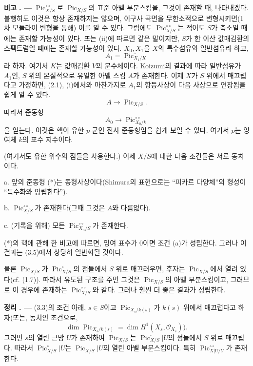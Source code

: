 \documentclass[11pt,twoside,openany]{book}
\numberwithin{equation}{section}
\newcommand{\sourceunit}{front}
\newcommand{\src}[1]{%
  \phantomsection\hypertarget{src:\sourceunit:#1}{}%
  \marginpar{\raggedleft\footnotesize\sffamily #1}%
}
\theoremstyle{plain}
\theoremstyle{definition}
\theoremstyle{remark}
\newcommand{\result}[2]{%
  \par\medskip\noindent\textbf{#1%
  \if\relax\detokenize{#2}\relax\else\space#2\fi. ---}\enspace
}
\begin{document}
\result{비고}{3.4} $\operatorname{Pic}_{X/S}^{\circ\circ}$로
$\operatorname{Pic}_{X/S}$의 표준 아벨 부분스킴을, 그것이 존재할 때,
나타내겠다. 불행히도 이것은 항상 존재하지는 않으며, 이구사 곡면을
무한소적으로 변형시키면(1차 모듈라이 변형을 통해) 이를 알 수 있다.
그럼에도 $\operatorname{Pic}_{X/S}^{\circ\circ}$는 적어도 $S$가 축소일
때에는 존재할 가능성이 있다. 또는 (ii)에 따르면 같은 말이지만, $S$가
한 이산 값매김환의 스펙트럼일 때에는 존재할 가능성이 있다. $X_0,X_1$을
$X$의 특수섬유와 일반섬유라 하고,
\[
A_1=\operatorname{Pic}_{X_1/K}^\circ
\]
라 하자. 여기서 $K$는 값매김환 $V$의 분수체이다. Koizumi의 결과에 따라
일반섬유가 $A_1$인, $S$ 위의 본질적으로 유일한 아벨 스킴 $A$가 존재한다.
이제 $X$가 $S$ 위에서 매끄럽다고 가정하면, (2.1), (i)에서와 마찬가지로
$A_1$의 항등사상이 다음 사상으로 연장됨을 쉽게 알 수 있다.
\[
A\longrightarrow\operatorname{Pic}_{X/S}.
\]
따라서 준동형
\[
\tag{*}A_0\longrightarrow\operatorname{Pic}_{X_0/k}^{\circ\circ}
\]
을 얻는다. 이것은 핵이 유한 $p$-군인 전사 준동형임을 쉽게 보일 수 있다.
여기서 $p$는 잉여체 $k$의 표수 지수이다.

\src{239}
(여기서도 유한 위수의 점들을 사용한다.) 이제 $X/S$에 대한 다음 조건들은
서로 동치이다.

\medskip
\noindent a. 앞의 준동형 (*)는 동형사상이다(Shimura의 표현으로는
``피카르 다양체''의 형성이 ``특수화와 양립한다'').

\noindent b. $\operatorname{Pic}_{X/S}^{\circ\circ}$가 존재한다(그때 그것은
$A$와 다름없다).

\noindent c. (기록을 위해) 모든
$\operatorname{Pic}_{X_n/S}^{\circ\circ}$가 존재한다.

(*)의 핵에 관해 한 비고에 따르면, 잉여 표수가 0이면 조건 (a)가 성립한다.
그러나 이 결과는 (3.5)에서 상당히 일반화될 것이다.

물론 $\operatorname{Pic}_{X/S}$가 $\operatorname{Pic}_{X/S}^\circ$의
점들에서 $S$ 위로 매끄러우면, 후자는 $\operatorname{Pic}_{X/S}$에서
열려 있다(cf. (1.7)). 따라서 유도된 구조를 주면 그것은
$\operatorname{Pic}_{X/S}$의 아벨 부분스킴이고, 그러므로 이 경우에
존재하는 $\operatorname{Pic}_{X/S}^{\circ\circ}$와 같다. 그러나 훨씬
더 좋은 결과가 성립한다.
\result{정리}{3.5} (3.3)의 조건 아래, $s\in S$이고
$\operatorname{Pic}_{X_s/k(s)}$가 $k(s)$ 위에서 매끄럽다고 하자(또는,
동치인 조건으로,
\[
\dim\operatorname{Pic}_{X_s/k(s)}=\dim H^1(X_s,\mathcal O_{X_s})).
\]
그러면 $s$의 열린 근방 $U$가 존재하여
$\operatorname{Pic}_{X/S}$는 $\operatorname{Pic}_{X/S}^\circ|U$의
점들에서 $S$ 위로 매끄럽다. 따라서 $\operatorname{Pic}_{X/S}^\circ|U$는
$\operatorname{Pic}_{X/S}|U$의 열린 아벨 부분스킴이다. 특히
$\operatorname{Pic}_{X|U/U}^{\circ\circ}$가 존재한다.
\end{document}

